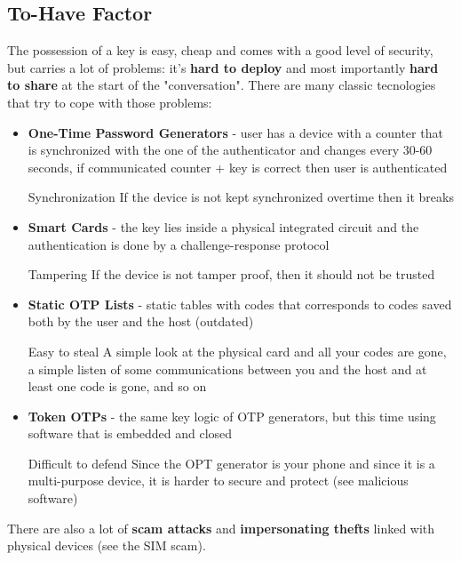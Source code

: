 \subsection{To-Have Factor}
The possession of a key is easy, cheap and comes with a good level of security,
but carries a lot of problems: it's \textbf{hard to deploy} and most 
importantly \textbf{hard to share} at the start of the "conversation". 
There are many classic tecnologies that try to cope with those problems:
\begin{itemize}
    \item \textbf{One-Time Password Generators} - user has a device with a 
    counter that is synchronized with the one of the authenticator and changes
    every 30-60 seconds, if communicated counter + key is correct then user is
    authenticated
    \begin{warning}{Synchronization}
        If the device is not kept synchronized overtime then it breaks
    \end{warning}
    \item \textbf{Smart Cards} - the key lies inside a physical integrated 
    circuit and the authentication is done by a challenge-response protocol
    \begin{warning}{Tampering}
        If the device is not tamper proof, then it should not be trusted
    \end{warning}
    \item \textbf{Static OTP Lists} - static tables with codes that corresponds
    to codes saved both by the user and the host (outdated)
    \begin{warning}{Easy to steal}
        A simple look at the physical card and all your codes are gone, a 
        simple listen of some communications between you and the host and at 
        least one code is gone, and so on
    \end{warning}
    \item \textbf{Token OTPs} - the same key logic of OTP generators, but this
    time using software that is embedded and closed
    \begin{warning}{Difficult to defend}
        Since the OPT generator is your phone and since it is a multi-purpose
        device, it is harder to secure and protect (see malicious software)
    \end{warning}
\end{itemize}
There are also a lot of \textbf{scam attacks} and \textbf{impersonating thefts}
linked with physical devices (see the SIM scam).

